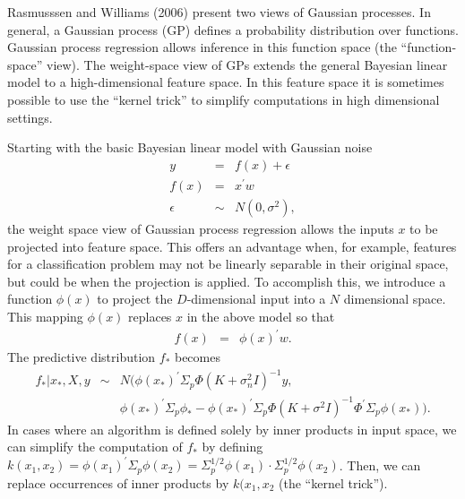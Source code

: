 \documentclass[12pt,letterpaper]{article}
\begin{document}

Rasmusssen and Williams (2006) present two views of Gaussian processes. In general, a Gaussian process (GP) defines a probability distribution over functions. Gaussian process regression allows inference in this function space (the ``function-space'' view). The weight-space view of GPs extends the general Bayesian linear model to a high-dimensional feature space. In this feature space it is sometimes possible to use the ``kernel trick'' to simplify computations in high dimensional settings.

Starting with the basic Bayesian linear model with Gaussian noise
\begin{eqnarray*}
 y        &=&    f(x) + \epsilon \\
 f(x)     &=&    x^{\prime}w \\
 \epsilon &\sim& N(0, \sigma^2),
\end{eqnarray*} 
the weight space view of Gaussian process regression allows the inputs $x$ to be projected into feature space. This offers an advantage when, for example, features for a classification problem may not be linearly separable in their original space, but could be when the projection is applied. To accomplish this, we introduce a function $\phi(x)$ to project the $D$-dimensional input into a $N$ dimensional space. This mapping $\phi(x)$ replaces $x$ in the above model so that 
\begin{eqnarray*}
 f(x)  &=& \phi(x)^\prime w.
\end{eqnarray*}
The predictive distribution $f_*$ becomes
\begin{eqnarray*}
f_* | x_*, X, y &\sim& N(\phi(x_*)^\prime \Sigma_p \Phi(K+\sigma^2_n I)^{-1}y, \\
&& \phi(x_*)^\prime \Sigma_p \phi_* - \phi(x_*)^\prime \Sigma_p \Phi(K + \sigma^2 I)^{-1} \Phi^\prime \Sigma_p \phi(x_*)).
\end{eqnarray*}
In cases where an algorithm is defined solely by inner products in input space, we can simplify the computation of $f_*$ by defining $k(x_1, x_2)=\phi(x_1)^\prime \Sigma_p \phi(x_2)=\Sigma^{1/2}_p \phi(x_1) \cdot \Sigma^{1/2}_p \phi(x_2)$. Then, we can replace occurrences of inner products by $k(x_1, x_2$ (the ``kernel trick'').
\end{document}
